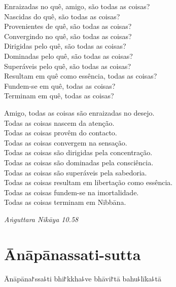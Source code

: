 \begin{english}
  Enraizadas no quê, amigo, são todas as coisas?\\
  Nascidas do quê, são todas as coisas?\\
  Provenientes de quê, são todas as coisas?\\
  Convergindo no quê, são todas as coisas?\\
  Dirigidas pelo quê, são todas as coisas?\\
  Dominadas pelo quê, são todas as coisas?\\
  Superáveis pelo quê, são todas as coisas?\\
  Resultam em quê como essência, todas as coisas?\\
  Fundem-se em quê, todas as coisas?\\
  Terminam em quê, todas as coisas?

  \bigskip

  Amigo, todas as coisas são enraizadas no desejo.\\
  Todas as coisas nascem da atenção.\\
  Todas as coisas provêm do contacto.\\
  Todas as coisas convergem na sensação.\\
  Todas as coisas são dirigidas pela concentração.\\
  Todas as coisas são dominadas pela consciência.\\
  Todas as coisas são superáveis pela sabedoria.\\
  Todas as coisas resultam em libertação como essência.\\
  Todas as coisas fundem-se na imortalidade.\\
  Todas as coisas terminam em Nibbāna.

\end{english}

{\raggedleft
  \emph{Aṅguttara Nikāya 10.58}
\par}

\chapter{Ānāpānassati-sutta}


\begin{leader}
\end{leader}

Ānāpāna꜓ssa꜕ti bhi꜓kkha꜕ve bhāvi꜓tā bahu꜕līka꜕tā

